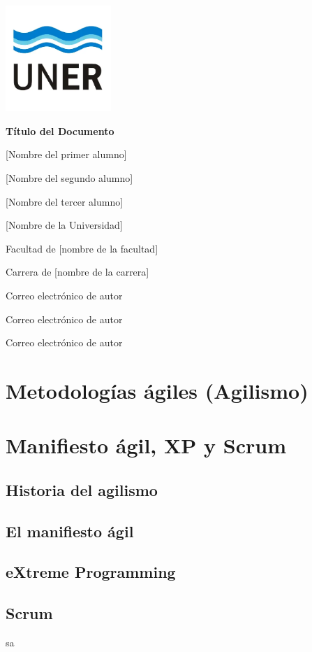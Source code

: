 \documentclass[a4paper,10pt]{article}
\begin{document}
	\pagestyle{empty}
	\begin{titlepage}
		\centering
		\vspace*{1.5cm}
		\includegraphics[width=0.3\textwidth]{unerlogo.png}
		\linebreak
		{\fontsize{14}{17}\bfseries Título del Documento\par}
		{\small [Nombre del primer alumno]\par}
		{\small [Nombre del segundo alumno]\par}
		{\small [Nombre del tercer alumno]\par}
		{\normalsize [Nombre de la Universidad]\par}
		{\normalsize Facultad de [nombre de la facultad]\par}
		{\normalsize Carrera de [nombre de la carrera]\par}
		{\small Correo electrónico de autor\par}
		{\small Correo electrónico de autor\par}
		{\small Correo electrónico de autor\par}
	\end{titlepage}
	
	\tableofcontents
	\thispagestyle{empty}
	
	\section{Metodologías ágiles (Agilismo)}
	\section{Manifiesto ágil, XP y Scrum}
	\subsection{Historia del agilismo}
	\subsection{El manifiesto ágil}
	\subsection{eXtreme Programming}
	\subsection{Scrum}
	sa
	\nocite{*}
	\printbibliography[heading=bibintoc]
\end{document}
